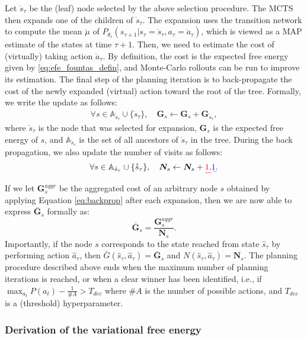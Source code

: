 \documentclass[twoside,11pt]{article}
\providecommand{\DIFadd}[1]{{\protect\color{blue}\uwave{#1}}} %
\providecommand{\DIFdel}[1]{{\protect\color{red}\sout{#1}}}                      %
\providecommand{\DIFaddbegin}{} %
\providecommand{\DIFaddend}{} %
\providecommand{\DIFdelbegin}{} %
\providecommand{\DIFdelend}{} %
\begin{document}
Let $\mathring{s}_\tau$ be the (leaf) node selected by the above selection procedure. The MCTS then expands one of the children of $\mathring{s}_\tau$. The expansion uses the transition network to compute the mean $\mathring{\mu}$ of $P_{\theta_s}(s_{\tau+1}|s_\tau=\mathring{s}_\tau, a_\tau=\mathring{a}_\tau)$, which is viewed as a MAP estimate of the states at time $\tau+1$. Then, we need to estimate the cost of (virtually) taking action $\mathring{a}_\tau$. By definition, the cost is the expected free energy given by \eqref{eq:efe_fountas_defin}, and Monte-Carlo rollouts can be run to improve its estimation. The final step of the planning iteration is to back-propagate the cost of the newly expanded (virtual) action toward the root of the tree. Formally, we write the update as follows:
\begin{align}\label{eq:backprop}
\forall s \in \mathbb{A}_{\mathring{s}_\tau} \cup \{\mathring{s}_\tau \}, \quad \bm{G}_{s} \leftarrow \bm{G}_{s} + \bm{G}_{\mathring{s}_\tau},
\end{align}
where $\mathring{s}_\tau$ is the node that was selected for expansion, $\bm{G}_{s}$ is the expected free energy of $s$, and $\mathbb{A}_{\mathring{s}_\tau}$ is the set of all ancestors of $\mathring{s}_\tau$ in the tree. During the back propagation, we also update the number of visits as follows:
\begin{align}\label{eq:backprop_n}
\forall s \in \mathbb{A}_{\mathring{s}_\tau} \cup \{\mathring{s}_\tau \}, \quad \bm{N}_{s} \leftarrow \bm{N}_{s} + \DIFdelbegin \DIFdel{1,
}\DIFdelend \DIFaddbegin \DIFadd{1.
}\DIFaddend \end{align}
If we let $\bm{G}^{aggr}_s$ be the aggregated cost of an arbitrary node $s$ obtained by applying Equation \ref{eq:backprop} after each expansion, then we are now able to express $\bar{\bm{G}}_s$ formally as:
$$\bar{\bm{G}}_s = \frac{\bm{G}^{aggr}_s}{\bm{N}_s}.$$
Importantly, if the node $s$ corresponds to the state reached from state $\hat{s}_\tau$ by performing action $\hat{a}_\tau$, then $\bar{G}(\hat{s}_\tau, \hat{a}_\tau) = \bar{\bm{G}}_s$ and $N(\hat{s}_\tau, \hat{a}_\tau) = \bm{N}_s$. The planning procedure described above ends when the maximum number of planning iterations is reached, or when a clear winner has been identified, i.e., if $\max_{a_t} P(a_t)-\frac{1}{\#A}>T_{dec}$ where $\#A$ is the number of possible actions, and $T_{dec}$ is a (threshold) hyperparameter.

\subsubsection{Derivation of the variational free energy}\label{ssec:derive_vfe_in_fountas}
\end{document}
